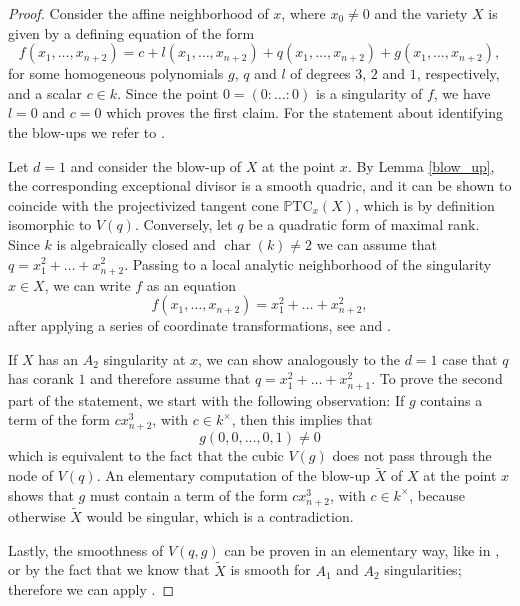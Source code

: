 \documentclass[a4paper, twoside, 11pt]{amsart}
\theoremstyle{definition}
\theoremstyle{remark}
\numberwithin{equation}{theorem}
\DeclareMathOperator{\characteris}{char}
\begin{document}
\begin{proof}
	Consider the affine neighborhood of $x$, where $x_0 \neq 0$ and the variety $X$ is given by a defining equation of the form
	\begin{equation}\label{defining_equation}
		f(x_1,\dots,x_{n+2}) = c + l(x_1,\dots, x_{n+2})+q(x_1,\dots,x_{n+2}) + g(x_1,\dots, x_{n+2}),
	\end{equation}
	for some homogeneous polynomials $g$, $q$ and $l$ of degrees $3$, $2$ and $1$, respectively, and a scalar $c \in k$. Since the point $0 = (0:\dots:0)$ is a singularity of $f$, we have $l=0$ and $c=0$ which proves the first claim. For the statement about identifying the blow-ups we refer to \cite[§1.5]{geocubic}.  

	Let $d=1$ and consider the blow-up of $X$ at the point $x$. By Lemma \ref{blow_up}, the corresponding exceptional divisor is a smooth quadric, and it can be shown to coincide with the projectivized tangent cone $\mathbb{P}\text{TC}_x(X)$, which is by definition isomorphic to $V(q)$. Conversely, let $q$ be a quadratic form of maximal rank. Since $k$ is algebraically closed and $\characteris(k) \neq 2$ we can assume that $q=x_1^2+\dots +x_{n+2}^2$. Passing to a local analytic neighborhood of the singularity $x \in X$, we can write $f$ as an equation
    \begin{equation*}
        f(x_1,\dots,x_{n+2}) = x_1^2+\dots+x_{n+2}^2, 
    \end{equation*}
    after applying a series of coordinate transformations, see \cite[Theorem 2.46]{Morse_book} and \cite[Morse Lemma (2.2)]{milnorMorse}. 
    
    If $X$ has an $A_2$ singularity at $x$, we can show analogously to the $d=1$ case that $q$ has corank $1$ and therefore assume that $q=x_1^2+\dots +x_{n+1}^2$. To prove the second part of the statement, we start with the following observation: If $g$ contains a term of the form $cx_{n+2}^3$, with $c\in k^{\times}$, then this implies that 
    \begin{equation}\label{observation}
		g(0,0,\dots,0,1) \neq 0
	\end{equation}
    which is equivalent to the fact that the cubic $V(g)$ does not pass through the node of $V(q)$. An elementary computation of the blow-up $\widetilde{X}$ of $X$ at the point $x$ shows that $g$ must contain a term of the form $cx_{n+2}^3$, with $c\in k^{\times}$, because otherwise $\widetilde{X}$ would be singular, which is a contradiction.

    Lastly, the smoothness of $V(q,g)$ can be proven in an elementary way, like in \cite[Proposition 2.8]{A2_v2}, or by the fact that we know that $\widetilde{X}$ is smooth for $A_1$ and $A_2$ singularities; therefore we can apply 
    \cite[Lemma 2.6]{blow_up_smooth_center}. 
\end{proof}
\end{document}
